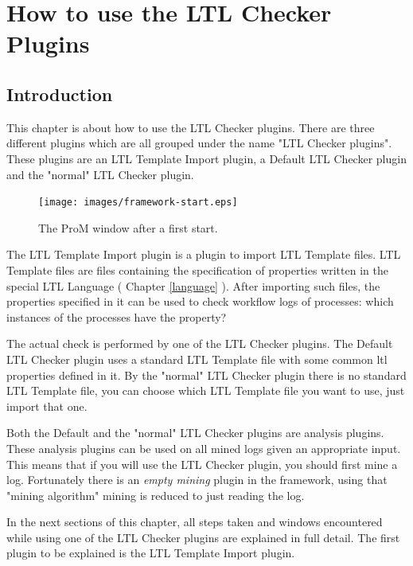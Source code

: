 \chapter[Use of the LTL Checker Plugins]{How to use the LTL Checker Plugins}
\label{plugingui}

\section{Introduction}
\label{plugingui:introduction}

This chapter is about how to use the LTL Checker plugins. There are three
different plugins which are all grouped under the name "LTL Checker plugins". These
plugins are an LTL Template Import plugin, a Default LTL Checker plugin and
the "normal" LTL Checker plugin.

\begin{figure}[H]
    \texttt{[image: images/framework-start.eps]}
    \caption{The ProM window after a first start.}
    \label{plugingui:start}
\end{figure}

The LTL Template Import plugin is a plugin to import LTL
Template files. LTL Template files are files containing the specification of properties written in
the special LTL Language ( Chapter \ref{language} ). After importing such files, the
properties specified in it can be used to check workflow logs of processes:
which instances of the processes have the property?

The actual check is performed by one of the LTL Checker plugins. The Default
LTL Checker plugin uses a standard LTL Template file with some common ltl
properties defined in it. By the "normal"  LTL Checker plugin there is no standard LTL
Template file, you can choose which LTL Template file you want to
use, just import that one.

Both the Default and the "normal" LTL Checker plugins are analysis plugins. These analysis plugins can
be used on all mined logs given an appropriate input. This means that if you
will use the LTL Checker plugin, you should first mine a log. Fortunately
there is an \textit{empty mining} plugin in the framework, using that "mining
algorithm" mining is reduced to just reading the log.

In the next sections of this chapter, all steps taken and windows encountered while
using one of the LTL Checker plugins are explained in full detail. The first
plugin to be explained is the LTL Template Import plugin.

